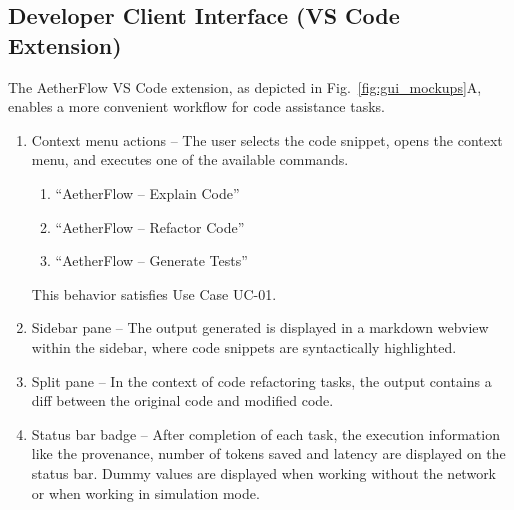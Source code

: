 \documentclass{FastFyp}
\begin{document}
\subsection{Developer Client Interface (VS Code Extension)}
The AetherFlow VS Code extension, as depicted in Fig.~\ref{fig:gui_mockups}A,
enables a more convenient workflow for code assistance tasks.
\begin{enumerate}
    \item Context menu actions -- The user selects the code snippet, opens the
            context menu, and executes one of the available commands.
    \begin{enumerate}
        \item ``AetherFlow -- Explain Code''
        \item ``AetherFlow -- Refactor Code''
        \item ``AetherFlow -- Generate Tests''
    \end{enumerate}
    This behavior satisfies Use Case UC-01.
    \item Sidebar pane -- The output generated is displayed in a markdown
            webview within the sidebar, where code snippets are syntactically highlighted.
    \item Split pane -- In the context of code refactoring tasks, the output
            contains a diff between the original code and modified code.
    \item Status bar badge -- After completion of each task, the execution information
            like the provenance, number of tokens saved and latency are displayed on the
            status bar. Dummy values are displayed when working without the network or
            when working in simulation mode.
\end{enumerate}
\end{document}
